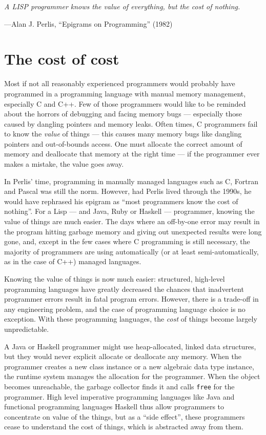 \epigraph{\itshape A LISP programmer knows the value of everything, but the cost of nothing.}
         {---Alan J. Perlis, ``Epigrams on Programming'' (1982)}

\nocite{Epigrams}
         
\section{The cost of cost}
Most if not all reasonably experienced programmers would probably have programmed in a programming language with
manual memory management, especially C and C++. Few of those programmers would like to be reminded about the horrors
of debugging and facing memory bugs --- especially those caused by dangling pointers and memory leaks. Often times,
C programmers fail to know the \emph{value} of things --- this causes many memory bugs like dangling pointers and
out-of-bounds access. One must allocate the correct amount of memory and deallocate that memory at the right time ---
if the programmer ever makes a mistake, the value goes away.

In Perlis' time, programming in manually managed languages such as C, Fortran and Pascal was still the norm. However, had Perlis
lived through the 1990s, he would have rephrased his epigram as ``most programmers know the cost of nothing''.
For a Lisp --- and Java, Ruby or Haskell --- programmer, knowing the value of things are much easier. The days where an
off-by-one error may result in the program hitting garbage memory and giving out unexpected results were long gone, and, except
in the few cases where C programming is still necessary, the majority of programmers are using automatically (or at least
semi-automatically, as in the case of C++) managed languages.

Knowing the value of things is now much easier: structured, high-level programming languages have greatly decreased the chances
that inadvertent programmer errors result in fatal program errors. However, there is a trade-off in any engineering problem, and the
case of programming language choice is no exception. With these programming languages, the \emph{cost} of things become
largely unpredictable.

A Java or Haskell programmer might use heap-allocated, linked data structures, but they would never explicit allocate or deallocate
any memory. When the programmer creates a new class instance or a new algebraic data type instance, the runtime system manages the
allocation for the programmer. When the object becomes unreachable, the garbage collector finds it and calls \lstinline{free} for
the programmer. High level imperative programming languages like Java and functional programming languages Haskell thus allow programmers
to concentrate on value of the things, but as a ``side effect'', these programmers cease to understand the cost of things, which is
abstracted away from them. 

